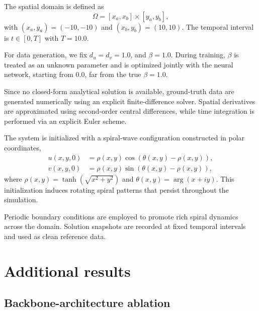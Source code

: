 \documentclass{article}
\theoremstyle{plain}
\theoremstyle{definition}
\theoremstyle{remark}
\begin{document}
The spatial domain is defined as
\begin{equation}
\Omega = [x_a, x_b] \times [y_a, y_b],
\end{equation}
with $(x_a, y_a) = (-10, -10)$ and $(x_b, y_b) = (10, 10)$.
The temporal interval is $t \in [0, T]$ with $T = 10.0$.

For data generation, we fix $d_u = d_v = 1.0$, and $\beta = 1.0$. During training, $\beta$ is treated as an unknown parameter and is optimized jointly with the neural network, starting from $0.0$, far from the true $\beta=1.0$.

Since no closed-form analytical solution is available, ground-truth data are generated numerically using an explicit finite-difference solver. Spatial derivatives are approximated using second-order central differences, while time integration is performed via an explicit Euler scheme.

The system is initialized with a spiral-wave configuration constructed in polar coordinates,
\begin{align}
    u(x,y,0) &= \rho(x,y) \cos(\theta(x,y) - \rho(x,y)), \\
    v(x,y,0) &= \rho(x,y) \sin(\theta(x,y) - \rho(x,y)),
\end{align}
where $\rho(x,y) = \tanh\!\left(\sqrt{x^2 + y^2}\right)$ and $\theta(x,y) = \arg(x + i y)$. This initialization induces rotating spiral patterns that persist throughout the simulation.

Periodic boundary conditions are employed to promote rich spiral dynamics across the domain. Solution snapshots are recorded at fixed temporal intervals and used as clean reference data.

\section{Additional results}
\label{appendix:analysis}

\subsection{Backbone-architecture ablation}
\label{appendix:backbone_ablation}
\end{document}
